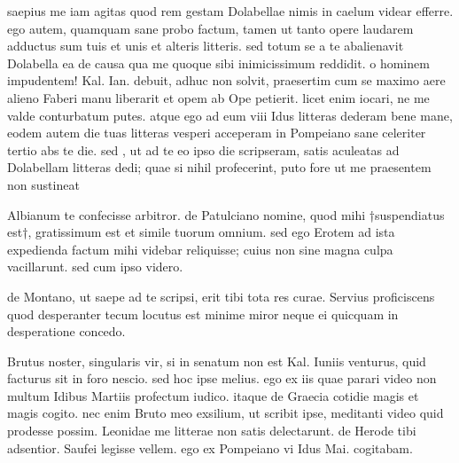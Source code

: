 


 saepius me iam agitas quod rem gestam Dolabellae nimis in caelum videar efferre. ego autem, quamquam sane probo factum, tamen ut tanto opere laudarem adductus sum tuis et unis et alteris litteris. sed totum se a te abalienavit Dolabella ea de causa qua me quoque sibi inimicissimum reddidit. o hominem impudentem! Kal. Ian. debuit, adhuc non solvit, praesertim cum se maximo aere alieno Faberi manu liberarit et opem ab Ope petierit. licet enim iocari, ne me valde conturbatum putes. atque ego ad eum viii Idus litteras dederam bene mane, eodem autem die tuas litteras vesperi acceperam in Pompeiano sane celeriter tertio abs te die. sed , ut ad te eo ipso die scripseram, satis aculeatas ad Dolabellam litteras dedi; quae si nihil profecerint, puto fore ut me praesentem non sustineat

 Albianum te confecisse arbitror. de Patulciano nomine, quod mihi †suspendiatus est†, gratissimum est et simile tuorum omnium. sed ego Erotem ad ista expedienda factum mihi videbar reliquisse; cuius non sine magna culpa vacillarunt. sed cum ipso videro.

 de Montano, ut saepe ad te scripsi, erit tibi tota res curae. Servius proficiscens quod desperanter tecum locutus est minime miror neque ei quicquam in desperatione concedo.

 Brutus noster, singularis vir, si in senatum non est Kal. Iuniis venturus, quid facturus sit in foro nescio. sed hoc ipse melius. ego ex iis quae parari video non multum Idibus Martiis profectum iudico. itaque de Graecia cotidie magis et magis cogito. nec enim Bruto meo exsilium, ut scribit ipse, meditanti video quid prodesse possim. Leonidae me litterae non satis delectarunt. de Herode tibi adsentior. Saufei legisse vellem. ego ex Pompeiano vi Idus Mai. cogitabam.
